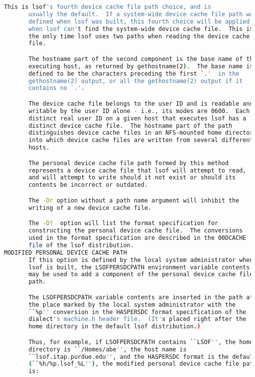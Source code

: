 {{\begin{lstlisting}[language=bash]
       This is lsof's fourth device cache file path choice, and is
       usually the default.  If a system-wide device cache file path was
       defined when lsof was built, this fourth choice will be applied
       when lsof can't find the system-wide device cache file.  This is
       the only time lsof uses two paths when reading the device cache
       file.

       The hostname part of the second component is the base name of the
       executing host, as returned by gethostname(2).  The base name is
       defined to be the characters preceding the first `.'  in the
       gethostname(2) output, or all the gethostname(2) output if it
       contains no `.'.

       The device cache file belongs to the user ID and is readable and
       writable by the user ID alone - i.e., its modes are 0600.  Each
       distinct real user ID on a given host that executes lsof has a
       distinct device cache file.  The hostname part of the path
       distinguishes device cache files in an NFS-mounted home directory
       into which device cache files are written from several different
       hosts.

       The personal device cache file path formed by this method
       represents a device cache file that lsof will attempt to read,
       and will attempt to write should it not exist or should its
       contents be incorrect or outdated.

       The -Dr option without a path name argument will inhibit the
       writing of a new device cache file.

       The -D?  option will list the format specification for
       constructing the personal device cache file.  The conversions
       used in the format specification are described in the 00DCACHE
       file of the lsof distribution.
MODIFIED PERSONAL DEVICE CACHE PATH
       If this option is defined by the local system administrator when
       lsof is built, the LSOFPERSDCPATH environment variable contents
       may be used to add a component of the personal device cache file
       path.

       The LSOFPERSDCPATH variable contents are inserted in the path at
       the place marked by the local system administrator with the
       ``%p'' conversion in the HASPERSDC format specification of the
       dialect's machine.h header file.  (It's placed right after the
       home directory in the default lsof distribution.)

       Thus, for example, if LSOFPERSDCPATH contains ``LSOF'', the home
       directory is ``/Homes/abe'', the host name is
       ``lsof.itap.purdue.edu'', and the HASPERSDC format is the default
       (``%h/%p.lsof_%L''), the modified personal device cache file path
       is:


\end{lstlisting}}}
